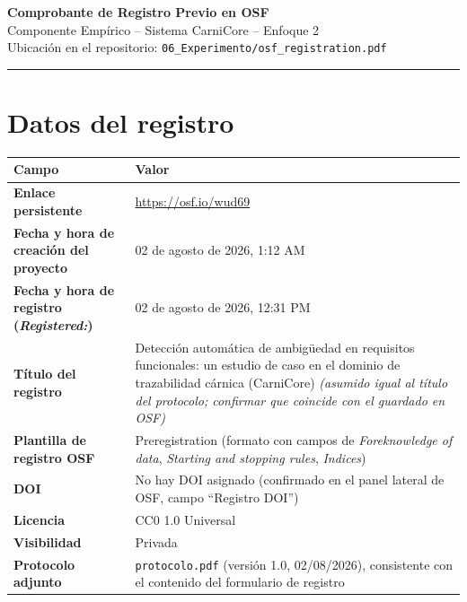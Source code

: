 \documentclass[11pt,a4paper]{article}
\begin{document}
\begin{center}
    {\Large\bfseries Comprobante de Registro Previo en OSF}\\[0.3em]
    {\large Componente Empírico -- Sistema CarniCore -- Enfoque 2}\\[0.6em]
    {\small Ubicación en el repositorio: \texttt{06\_Experimento/osf\_registration.pdf}}
\end{center}

\vspace{0.5em}
\hrule
\vspace{1em}

\section*{Datos del registro}

\renewcommand{\arraystretch}{1.4}
\begin{longtable}{@{}>{\bfseries}p{4.2cm} p{10.8cm}@{}}
\toprule
\rowcolor{griscelda}
Campo & Valor \\
\midrule
\endhead

Enlace persistente & \url{https://osf.io/wud69} \\
Fecha y hora de creación del proyecto & 02 de agosto de 2026, 1:12 AM \\
Fecha y hora de registro (\textit{Registered:}) & 02 de agosto de 2026, 12:31 PM \\
Título del registro &
Detección automática de ambigüedad en requisitos funcionales: un estudio de caso
en el dominio de trazabilidad cárnica (CarniCore) \newline
\textit{(asumido igual al título del protocolo; confirmar que coincide con el guardado en OSF)} \\
Plantilla de registro OSF &
Preregistration (formato con campos de \textit{Foreknowledge of data}, \textit{Starting
and stopping rules}, \textit{Indices}) \\
DOI &
No hay DOI asignado (confirmado en el panel lateral de OSF, campo ``Registro DOI'') \\
Licencia & CC0 1.0 Universal \\
Visibilidad & Privada \\
Protocolo adjunto &
\texttt{protocolo.pdf} (versión 1.0, 02/08/2026), consistente con el contenido del
formulario de registro \\
\bottomrule
\end{longtable}
\end{document}
